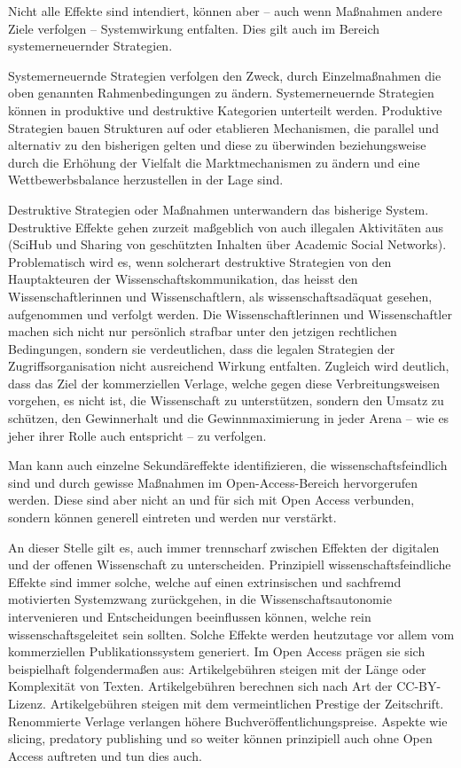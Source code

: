 \documentclass[a4paper,
fontsize=11pt,
oneside,
numbers=noperiodatend,
parskip=half-,
bibliography=totoc,
final
]{scrartcl}
\begin{document}
Nicht alle Effekte sind intendiert, können aber -- auch wenn Maßnahmen
andere Ziele verfolgen -- Systemwirkung entfalten. Dies gilt auch im
Bereich systemerneuernder Strategien.

Systemerneuernde Strategien verfolgen den Zweck, durch Einzelmaßnahmen
die oben genannten Rahmenbedingungen zu ändern. Systemerneuernde
Strategien können in produktive und destruktive Kategorien unterteilt
werden. Produktive Strategien bauen Strukturen auf oder etablieren
Mechanismen, die parallel und alternativ zu den bisherigen gelten und
diese zu überwinden beziehungsweise durch die Erhöhung der Vielfalt die
Marktmechanismen zu ändern und eine Wettbewerbsbalance herzustellen in
der Lage sind.

Destruktive Strategien oder Maßnahmen unterwandern das bisherige System.
Destruktive Effekte gehen zurzeit maßgeblich von auch illegalen
Aktivitäten aus (SciHub und Sharing von geschützten Inhalten über
Academic Social Networks). Problematisch wird es, wenn solcherart
destruktive Strategien von den Hauptakteuren der
Wissenschaftskommunikation, das heisst den Wissenschaftlerinnen und
Wissenschaftlern, als wissenschaftsadäquat gesehen, aufgenommen und
verfolgt werden. Die Wissenschaftlerinnen und Wissenschaftler machen
sich nicht nur persönlich strafbar unter den jetzigen rechtlichen
Bedingungen, sondern sie verdeutlichen, dass die legalen Strategien der
Zugriffsorganisation nicht ausreichend Wirkung entfalten. Zugleich wird
deutlich, dass das Ziel der kommerziellen Verlage, welche gegen diese
Verbreitungsweisen vorgehen, es nicht ist, die Wissenschaft zu
unterstützen, sondern den Umsatz zu schützen, den Gewinnerhalt und die
Gewinnmaximierung in jeder Arena -- wie es jeher ihrer Rolle auch
entspricht -- zu verfolgen.

Man kann auch einzelne Sekundäreffekte identifizieren, die
wissenschaftsfeindlich sind und durch gewisse Maßnahmen im
Open-Access-Bereich hervorgerufen werden. Diese sind aber nicht an und
für sich mit Open Access verbunden, sondern können generell eintreten
und werden nur verstärkt.

An dieser Stelle gilt es, auch immer trennscharf zwischen Effekten der
digitalen und der offenen Wissenschaft zu unterscheiden. Prinzipiell
wissenschaftsfeindliche Effekte sind immer solche, welche auf einen
extrinsischen und sachfremd motivierten Systemzwang zurückgehen, in die
Wissenschaftsautonomie intervenieren und Entscheidungen beeinflussen
können, welche rein wissenschaftsgeleitet sein sollten. Solche Effekte
werden heutzutage vor allem vom kommerziellen Publikationssystem
generiert. Im Open Access prägen sie sich beispielhaft folgendermaßen
aus: Artikelgebühren steigen mit der Länge oder Komplexität von Texten.
Artikelgebühren berechnen sich nach Art der CC-BY-Lizenz.
Artikelgebühren steigen mit dem vermeintlichen Prestige der Zeitschrift.
Renommierte Verlage verlangen höhere Buchveröffentlichungspreise.
Aspekte wie slicing, predatory publishing und so weiter können
prinzipiell auch ohne Open Access auftreten und tun dies auch.
\end{document}
